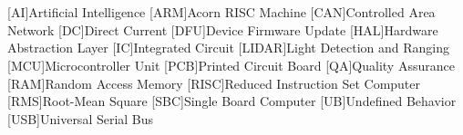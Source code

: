 \cleardoublepage
\chapter*{\listofabbrevname}
{}

\begin{acronym}[KolikMista]

	[AI]{Artificial Intelligence}
	[ARM]{Acorn RISC Machine}
	[CAN]{Controlled Area Network}
	[DC]{Direct Current}
	[DFU]{Device Firmware Update}
	[HAL]{Hardware Abstraction Layer}
	[IC]{Integrated Circuit}
	[LIDAR]{Light Detection and Ranging}
	[MCU]{Microcontroller Unit}
	[PCB]{Printed Circuit Board}
	[QA]{Quality Assurance}
	[RAM]{Random Access Memory}
	[RISC]{Reduced Instruction Set Computer}
	[RMS]{Root-Mean Square}
	[SBC]{Single Board Computer}
	[UB]{Undefined Behavior}
	[USB]{Universal Serial Bus}


\end{acronym}
